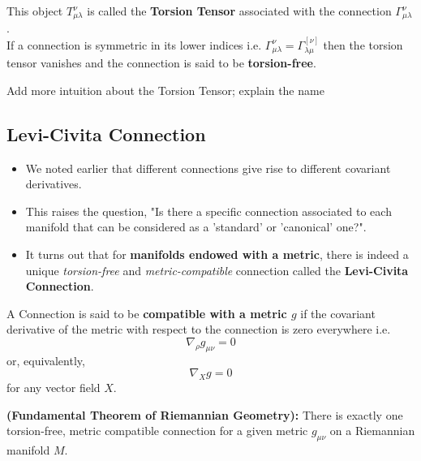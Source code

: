 \documentclass[11pt]{article}
\begin{document}
This object $T_{\mu \lambda}^{\nu}$ is called the \textbf{Torsion Tensor} associated with the connection $\Gamma_{\mu \lambda}^{\nu}$.
\\
If a connection is symmetric in its lower indices i.e. $\Gamma_{\mu \lambda}^{\nu} = \Gamma_{\lambda \mu}^[\nu]$ then the torsion tensor vanishes and the connection is said to be \textbf{torsion-free}.
\\
\begin{note}
  {Add more intuition about the Torsion Tensor; explain the name}
\end{note}

\subsection{Levi-Civita Connection}

\begin{itemize}
  \item We noted earlier that different connections give rise to different covariant derivatives. 
  \item This raises the question, "Is there a specific connection associated to each manifold that can be considered as a 'standard' or 'canonical' one?".
  \item It turns out that for \textbf{manifolds endowed with a metric}, there is indeed a unique \textit{torsion-free} and \textit{metric-compatible} connection called the \textbf{Levi-Civita Connection}.
\end{itemize}  

\begin{redbox}
  A Connection is said to be \textbf{compatible with a metric $g$} if the covariant derivative of the metric with respect to the connection is zero everywhere i.e.
  \[ \nabla_{\rho} g_{\mu \nu} = 0 \]
  or, equivalently,
  \[ \nabla_{X} g = 0 \]
  for any vector field $X$.
\end{redbox}

\begin{bluebox}
  \begin{theorem}
    \textbf{(Fundamental Theorem of Riemannian Geometry):} There is exactly one torsion-free, metric compatible connection for a given metric $g_{\mu \nu}$ on a Riemannian manifold $M$. 
  \end{theorem}
\end{bluebox}
\end{document}
